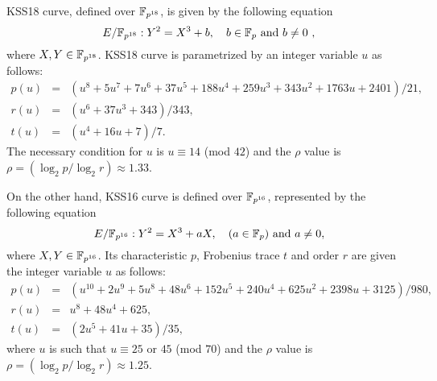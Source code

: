 KSS18 curve, defined over $\mathbb{F}_{p^{18}}$, is given by the following equation
\begin{equation}\label{eq:KSS_curve_18}
E/\mathbb{F}_{p^{18}}:Y^2=X^3+b, \quad \mbox{$b \in {\mathbb{F}}_{p}$ and $b \neq 0$ },
\end{equation}
where  $X,Y \in \mathbb{F}_{p^{18}}$. KSS18 curve is parametrized by an integer variable $u$ as follows:
\begin{subequations}
\begin{eqnarray}
p(u) & = & (u^8 +5u^7 +7u^6 +37u^5 +188u^4 +259u^3 + 343u^2 +1763u+2401)/21,\\\label{eq:kss_char}
r(u)  &=&  (u^6 + 37u^3 + 343)/343,\label{eq:kss_degree}  \\
t(u) &= & (u^4 + 16u + 7)/7. \label{eq:kss_trace} 
\end{eqnarray}
\end{subequations} 
The necessary condition for $u$ is $u \equiv 14$ (mod $42$) and the $\rho$ value is $\rho = (\log_2 p/\log_2 r) \approx 1.33$.

On the other hand, KSS16 curve is defined over $\mathbb{F}_{p^{16}}$, represented by the following equation
\begin{equation}\label{eq:KSS_16}
E/\mathbb{F}_{p^{16}}:Y^2=X^3+aX, \quad \mbox{($a \in {\mathbb{F}}_{p}$) and  $a \neq 0$},
\end{equation}
 where $X,Y \in \mathbb{F}_{p^{16}}$. Its characteristic $p$, Frobenius trace $t$ and order $r$ are given the integer variable $u$ as follows:
\begin{subequations}
\begin{eqnarray}
p(u) &= & (u^{10} +2u^9 +5u^8 +48u^6 +152u^5 +240u^4 +625u^2 +2398u+3125)/980,  \\\label{eq:kss_16_char}
r(u) &= & u^8 +48u^4 +625,\label{eq:kss_16_degree}  \\
t(u) &=& (2u^5 +41u+35)/35, \label{eq:kss_16_trace} 
\end{eqnarray}
\end{subequations} 
where $u$ is such that $u \equiv 25$ or $45$ (mod $70$) and the $\rho$ value is $\rho = (\log_2 p/\log_2 r) \approx 1.25$.

%



